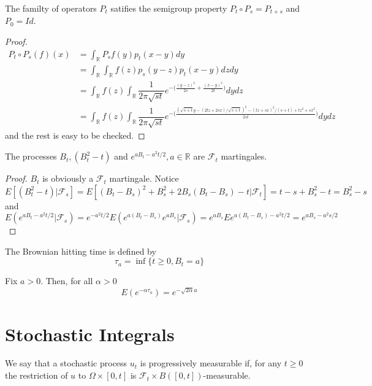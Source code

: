 \documentclass[lang=en, color=blue, ]{elegantbook}
\newcommand{\F}{\mathcal{F}}
\newcommand{\R}{\mathbb{R}}
\begin{document}
\begin{proposition}
    The familty of operators $P_t$ satifies the semigroup property $P_t\circ P_s = P_{t+s}$ and $P_0 = Id$.
\end{proposition}
\begin{proof}
    \[
    \begin{aligned}
    P_t\circ P_s(f)(x) &= \int_{\R} P_sf(y)p_t(x-y)dy \\ & = \int_{\R} \int_{\R} f(z) p_s(y-z)p_t(x-y) dzdy \\
    & = \int_{\R} f(z) \int_{\R} \dfrac{1}{2\pi \sqrt{st}} e^{-\Big(\tfrac{(y-z)^2}{2s}+\tfrac{(x-y)^2}{2t}\Big)} dydz \\
    & = \int_{\R} f(z) \int_{\R} \dfrac{1}{2\pi \sqrt{st}} e^{-\Big(\tfrac{(\sqrt{s+t}y-(2tz+2sx)/\sqrt{s+t})^2-(tz+sx)^2/(s+t)+tz^2+sx^2}{2st}\Big)} dydz
    \end{aligned}
    \]
    and the rest is easy to be checked.
\end{proof}

\begin{theorem}
    The processes $B_t, (B_t^2-t)$ and $e^{aB_t-a^2t/2}, a\in\R$ are $\F_t$ martingales.
\end{theorem}

\begin{proof}
    $B_t$ is obviously a $\F_t$ martingale. Notice
    \[
    E[(B_t^2-t)|\F_s] = E[(B_t-B_s)^2+B_s^2+2B_s(B_t-B_s)-t|\F_t] = t-s+B_s^2-t = B_s^2 - s
    \]
    and
    \[
    E(e^{aB_t-a^2t/2}|\F_s) = e^{-a^2t/2}E(e^{a(B_t-B_s)}e^{aB_s}|\F_s) = e^{aB_s}Ee^{a(B_t-B_s)-a^2t/2} = e^{aB_s-a^2s/2}
    \]
\end{proof}

\begin{definition}
    The Brownian hitting time is defined by
    \[\tau_a = \inf\{t\geq 0, B_t = a\}\]
\end{definition}

\begin{proposition}
    Fix $a>0$. Then, for all $\alpha > 0$
    \[E(e^{-\alpha\tau_a}) = e^{-\sqrt{2\alpha}a}\]
\end{proposition}

\section{Stochastic Integrals}

\begin{definition}
    We say that a stochastic process $u_t$ is progressively measurable if, for any $t\geq 0$ the restriction of $u$ to $\Omega\times [0,t]$ is $\F_t\times B([0,t])$-measurable.
\end{definition}
\end{document}
